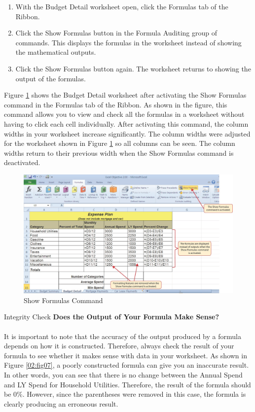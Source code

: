 \begin{enumerate}
	\item With the Budget Detail worksheet open, click the Formulas tab of the Ribbon.
	\item Click the Show Formulas button in the Formula Auditing group of commands. This displays the formulas in the worksheet instead of showing the mathematical outputs.
	\item Click the Show Formulas button again. The worksheet returns to showing the output of the
formulas.
\end{enumerate}

Figure \ref{02:fig08} shows the Budget Detail worksheet after activating the Show Formulas command in the Formulas tab of the Ribbon. As shown in the figure, this command allows you to view and check all the formulas in a worksheet without having to click each cell individually. After activating this command, the column widths in your worksheet increase significantly. The column widths were adjusted for the worksheet shown in Figure \ref{02:fig08} so all columns can be seen. The column widths return to their previous width when the Show Formulas command is deactivated.

\begin{figure}[H]
	\centering
	\includegraphics[width=\maxwidth{.95\linewidth}]{gfx/ch02_fig08}
	\caption{Show Formulas Command}
	\label{02:fig08}
\end{figure}

\begin{center}
	\begin{infobox}{Integrity Check}
		\textbf{Does the Output of Your Formula Make Sense?}
		\\
		\\
		It is important to note that the accuracy of the output produced by a formula depends on how it is constructed. Therefore, always check the result of your formula to see whether it makes sense with data in your worksheet. As shown in Figure \ref{02:fig07}, a poorly constructed formula can give you an inaccurate result. In other words, you can see that there is no change between the Annual Spend and LY Spend for Household Utilities. Therefore, the result of the formula should be 0\%. However, since the parentheses were removed in this case, the formula is clearly producing an erroneous result.
	\end{infobox}
\end{center}

